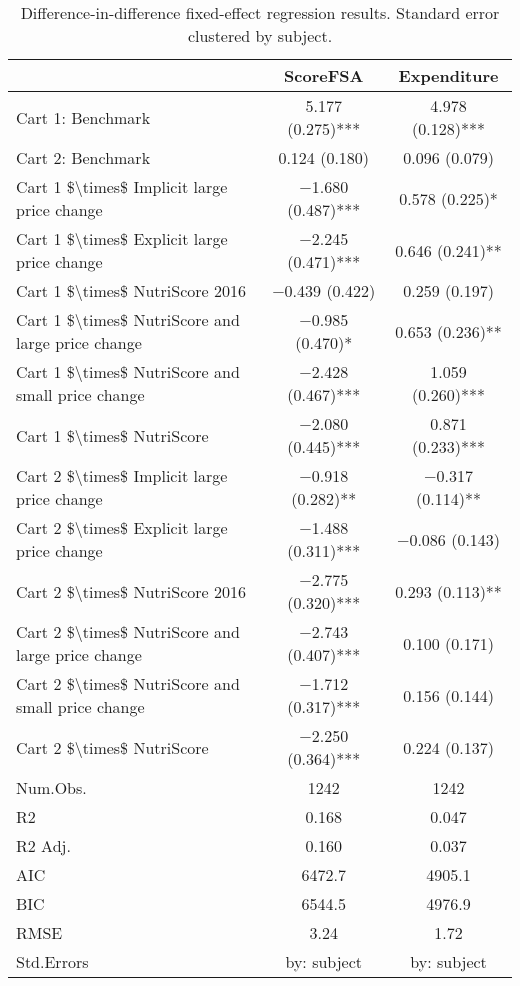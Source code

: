 \begin{table}

\caption{Difference-in-difference fixed-effect regression results. Standard error clustered by subject.}
\centering
\begin{tabular}[t]{lcc}
\toprule
  & ScoreFSA & Expenditure\\
\midrule
Cart 1: Benchmark & \num{5.177} (\num{0.275})*** & \num{4.978} (\num{0.128})***\\
Cart 2: Benchmark & \num{0.124} (\num{0.180}) & \num{0.096} (\num{0.079})\\
Cart 1 \$\textbackslash{}times\$ Implicit large price change & \num{-1.680} (\num{0.487})*** & \num{0.578} (\num{0.225})*\\
Cart 1 \$\textbackslash{}times\$ Explicit large price change & \num{-2.245} (\num{0.471})*** & \num{0.646} (\num{0.241})**\\
Cart 1 \$\textbackslash{}times\$ NutriScore 2016 & \num{-0.439} (\num{0.422}) & \num{0.259} (\num{0.197})\\
Cart 1 \$\textbackslash{}times\$ NutriScore and large price change & \num{-0.985} (\num{0.470})* & \num{0.653} (\num{0.236})**\\
Cart 1 \$\textbackslash{}times\$ NutriScore and small price change & \num{-2.428} (\num{0.467})*** & \num{1.059} (\num{0.260})***\\
Cart 1 \$\textbackslash{}times\$ NutriScore & \num{-2.080} (\num{0.445})*** & \num{0.871} (\num{0.233})***\\
Cart 2 \$\textbackslash{}times\$ Implicit large price change & \num{-0.918} (\num{0.282})** & \num{-0.317} (\num{0.114})**\\
Cart 2 \$\textbackslash{}times\$ Explicit large price change & \num{-1.488} (\num{0.311})*** & \num{-0.086} (\num{0.143})\\
Cart 2 \$\textbackslash{}times\$ NutriScore 2016 & \num{-2.775} (\num{0.320})*** & \num{0.293} (\num{0.113})**\\
Cart 2 \$\textbackslash{}times\$ NutriScore and large price change & \num{-2.743} (\num{0.407})*** & \num{0.100} (\num{0.171})\\
Cart 2 \$\textbackslash{}times\$ NutriScore and small price change & \num{-1.712} (\num{0.317})*** & \num{0.156} (\num{0.144})\\
Cart 2 \$\textbackslash{}times\$ NutriScore & \num{-2.250} (\num{0.364})*** & \num{0.224} (\num{0.137})\\
\midrule
Num.Obs. & \num{1242} & \num{1242}\\
R2 & \num{0.168} & \num{0.047}\\
R2 Adj. & \num{0.160} & \num{0.037}\\
AIC & \num{6472.7} & \num{4905.1}\\
BIC & \num{6544.5} & \num{4976.9}\\
RMSE & \num{3.24} & \num{1.72}\\
Std.Errors & by: subject & by: subject\\
\bottomrule
\end{tabular}
\end{table}
